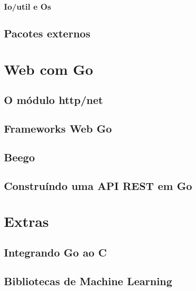 \documentclass{SBCbookchapter}
\begin{document}
\subsubsection{Io/util e Os}
\subsection{Pacotes externos}

\section{Web com Go}
\subsection{O módulo  http/net}
\subsection{Frameworks Web Go}
\subsection{Beego}
\subsection{Construíndo uma API REST em Go}

\section{Extras}
\subsection{Integrando Go ao C}
\subsection{Bibliotecas de Machine Learning}
\end{document}
